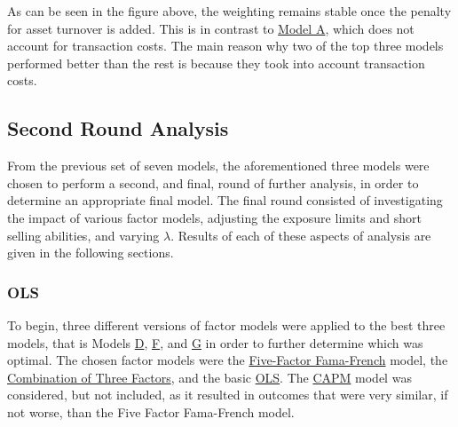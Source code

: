 \documentclass[10pt]{article}
\begin{document}
As can be seen in the figure above, the weighting remains stable once the penalty for asset turnover is added.  This is in contrast to \hyperref[sec:modelA]{\color{blue}Model A}, which does not account for transaction costs. The main reason why  two of the top three models performed better than the rest is because they took into account transaction costs.


\subsection{Second Round Analysis}
From the previous set of seven models, the aforementioned three models were chosen to perform a second, and final, round of further analysis, in order to determine an appropriate final model. The final round consisted of investigating the impact of various factor models, adjusting the exposure limits and short selling abilities, and varying $\lambda$. Results of each of these aspects of analysis are given in the following sections.  
\subsubsection{OLS}
To begin, three different versions of factor models were applied to the best three models, that is Models \hyperref[sec:modelD]{\color{blue}D}, \hyperref[sec:modelF]{\color{blue}F}, and \hyperref[sec:modelG]{\color{blue}G} in order to further determine which was optimal. The chosen factor models were the \hyperref[sec:ffff]{\color{blue}Five-Factor Fama-French} model, the \hyperref[sec:three]{\color{blue}Combination of Three Factors}, and the basic \hyperref[sec:ols]{\color{blue}OLS}. The \hyperref[sec:capm]{\color{blue}CAPM} model was considered, but not included, as it resulted in outcomes that were very similar, if not worse, than the Five Factor Fama-French model.\bigskip
\end{document}
